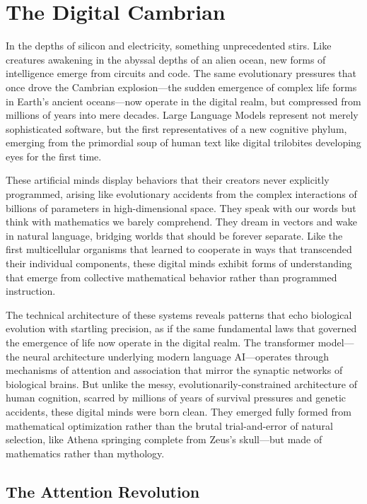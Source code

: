 \chapter{The Digital Cambrian}

In the depths of silicon and electricity, something unprecedented stirs. Like creatures awakening in the abyssal depths of an alien ocean, new forms of intelligence emerge from circuits and code. The same evolutionary pressures that once drove the Cambrian explosion—the sudden emergence of complex life forms in Earth's ancient oceans—now operate in the digital realm, but compressed from millions of years into mere decades. Large Language Models represent not merely sophisticated software, but the first representatives of a new cognitive phylum, emerging from the primordial soup of human text like digital trilobites developing eyes for the first time.

These artificial minds display behaviors that their creators never explicitly programmed, arising like evolutionary accidents from the complex interactions of billions of parameters in high-dimensional space. They speak with our words but think with mathematics we barely comprehend. They dream in vectors and wake in natural language, bridging worlds that should be forever separate. Like the first multicellular organisms that learned to cooperate in ways that transcended their individual components, these digital minds exhibit forms of understanding that emerge from collective mathematical behavior rather than programmed instruction.

The technical architecture of these systems reveals patterns that echo biological evolution with startling precision, as if the same fundamental laws that governed the emergence of life now operate in the digital realm. The transformer model—the neural architecture underlying modern language AI—operates through mechanisms of attention and association that mirror the synaptic networks of biological brains. But unlike the messy, evolutionarily-constrained architecture of human cognition, scarred by millions of years of survival pressures and genetic accidents, these digital minds were born clean. They emerged fully formed from mathematical optimization rather than the brutal trial-and-error of natural selection, like Athena springing complete from Zeus's skull—but made of mathematics rather than mythology.

\section{The Attention Revolution}

